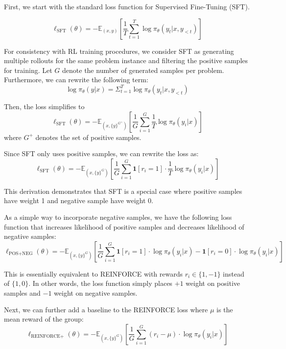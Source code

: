 \documentclass{article}
\begin{document}
First, we start with the standard loss function for Supervised Fine-Tuning (SFT).

\[ \ell_{\text{SFT}}(\theta) = - \mathbb{E}_{(x, y)} \left[ \frac{1}{T} \sum_{t = 1}^T \log \pi_\theta(y_t \vert x, y_{< t}) \right] \]

For consistency with RL training procedures, we consider SFT as generating multiple rollouts for the same problem instance and filtering the positive samples for training. Let $G$ denote the number of generated samples per problem. Furthermore, we can rewrite the following term:
\[
    \log \pi_\theta(y \vert x) = \Sigma_{t = 1}^T \log \pi_\theta(y_t \vert x, y_{< t})
\]

Then, the loss simplifies to 
\[
    \ell_{\text{SFT}}(\theta) = - \mathbb{E}_{(x, \{y\}^{G^+})} \left[ \frac{1}{G} \sum_{i = 1}^G \frac{1}{T} \log \pi_\theta(y_i \vert x) \right]
\]
where $G^+$ denotes the set of positive samples.

Since SFT only uses positive samples, we can rewrite the loss as:
\begin{equation}
    \ell_{\text{SFT}}(\theta) = - \mathbb{E}_{(x, \{y\}^G)} \left[ \frac{1}{G} \sum_{i = 1}^G \boldsymbol{1}[r_i = 1] \cdot \frac{1}{T} \log \pi_\theta(y_i \vert x) \right]
    \label{eq:SFT}
\end{equation}

This derivation demonstrates that SFT is a special case where positive samples have weight 1 and negative sample have weight 0.

As a simple way to incorporate negative samples, we have the following loss function that increases likelihood of positive samples and decreases likelihood of negative samples:
\begin{equation}
    \ell_{\text{POS+NEG}}(\theta) = - \mathbb{E}_{(x, \{y\}^G)} \left[ \frac{1}{G} \sum_{i = 1}^G \boldsymbol{1}[r_i = 1] \cdot \log \pi_\theta(y_i \vert x) - \boldsymbol{1}[r_i = 0] \cdot \log \pi_\theta(y_i \vert x) \right]
    \label{eq:POS+NEG}
\end{equation}

This is essentially equivalent to REINFORCE \citep{williamsSimple1992} with rewards $r_i \in \{1, -1\}$ instead of $\{1, 0\}$. In other words, the loss function simply places $+1$ weight on positive samples and $-1$ weight on negative samples.

Next, we can further add a baseline to the REINFORCE loss where $\mu$ is the mean reward of the group:
\begin{equation}
    \ell_{\text{REINFORCE+}}(\theta) = - \mathbb{E}_{(x, \{y\}^G)} \left[ \frac{1}{G} \sum_{i = 1}^G (r_i - \mu) \cdot \log \pi_\theta(y_i \vert x) \right]
    \label{eq:REINFORCE+}
\end{equation}
\end{document}
